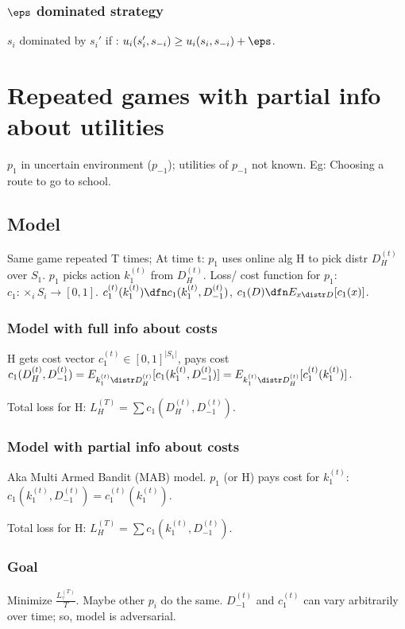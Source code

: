\documentclass[10pt]{amsart}
\begin{document}
\subsubsection{$\eps$ dominated strategy}
$s_{i}$ dominated by $s_{i}'$ if : $u_{i}(s'_{i}, s_{-i}) \geq u_{i}(s_{i}, s_{-i}) + \eps$.

\section{Repeated games with partial info about utilities}
$p_{1}$ in uncertain environment ($p_{-1}$); utilities of $p_{-1}$ not known. Eg: Choosing a route to go to school.

\subsection{Model}
Same game repeated T times; At time t:
$p_{1}$ uses online alg H to pick distr $D_{H}^{(t)}$ over $S_{1}$. $p_{1}$ picks action $k_{1}^{(t)}$ from $D_{H}^{(t)}$. Loss/ cost function for $p_{1}$: $c_{1}:\times_{i}S_{i} \to [0,1]$. $c_{1}^{(t)}(k_{1}^{(t)}) \dfn c_{1}(k_{1}^{(t)}, D_{-1}^{(t)})$, $c_{1}(D) \dfn E_{x \distr D}[c_{1}(x)]$.

\subsubsection{Model with full info about costs}
H gets cost vector $c_{1}^{(t)} \in [0,1]^{|S_{1}|}$, pays cost \\
$c_{1}(D_{H}^{(t)}, D_{-1}^{(t)}) = E_{k_{1}^{(t)} \distr D_{H}^{(t)}}[c_{1}(k_{1}^{(t)}, D_{-1}^{(t)})] = E_{k_{1}^{(t)} \distr D_{H}^{(t)}}[c_{1}^{(t)}(k_{1}^{(t)})]$.

Total loss for H: $L_{H}^{(T)} = \sum c_{1}(D_{H}^{(t)}, D_{-1}^{(t)})$.

\subsubsection{Model with partial info about costs}
Aka Multi Armed Bandit (MAB) model. $p_{1}$ (or H) pays cost for $k_{1}^{(t)}$: $c_{1}(k_{1}^{(t)}, D_{-1}^{(t)}) = c_{1}^{(t)}(k_{1}^{(t)})$.

Total loss for H: $L_{H}^{(T)} = \sum c_{1}(k_{1}^{(t)}, D_{-1}^{(t)})$.

\subsubsection{Goal}
Minimize $\frac{L_{?}^{(T)}}{T}$. Maybe other $p_{i}$ do the same. $D_{-1}^{(t)}$ and $c_{1}^{(t)}$ can vary arbitrarily over time; so, model is adversarial.
\end{document}
